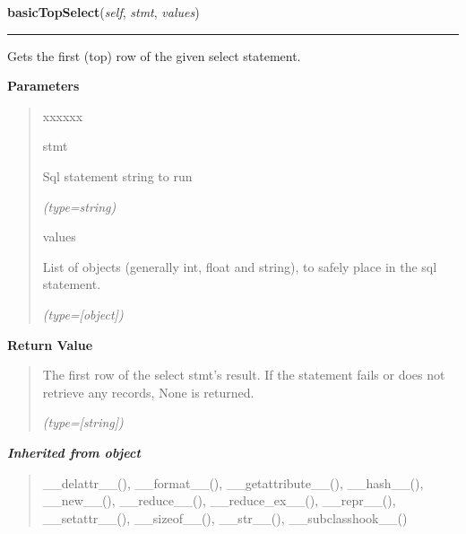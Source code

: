 \hspace{.8\funcindent}\begin{boxedminipage}{\funcwidth}

    \raggedright \textbf{basicTopSelect}(\textit{self}, \textit{stmt}, \textit{values})

    \vspace{-1.5ex}

    \rule{\textwidth}{0.5\fboxrule}
\setlength{\parskip}{2ex}
    Gets the first (top) row of the given select statement.

\setlength{\parskip}{1ex}
      \textbf{Parameters}
      \vspace{-1ex}

      \begin{quote}
        \begin{Ventry}{xxxxxx}

          \item[stmt]

          Sql statement string to run

            {\it (type=string)}

          \item[values]

          List of objects (generally int, float and string), to safely 
          place in the sql statement.

            {\it (type=[object])}

        \end{Ventry}

      \end{quote}

      \textbf{Return Value}
    \vspace{-1ex}

      \begin{quote}
      The first row of the select stmt's result. If the statement fails or 
      does not retrieve any records, None is returned.

      {\it (type=[string])}

      \end{quote}

    \end{boxedminipage}


\large{\textbf{\textit{Inherited from object}}}

\begin{quote}
\_\_delattr\_\_(), \_\_format\_\_(), \_\_getattribute\_\_(), \_\_hash\_\_(), \_\_new\_\_(), \_\_reduce\_\_(), \_\_reduce\_ex\_\_(), \_\_repr\_\_(), \_\_setattr\_\_(), \_\_sizeof\_\_(), \_\_str\_\_(), \_\_subclasshook\_\_()
\end{quote}

